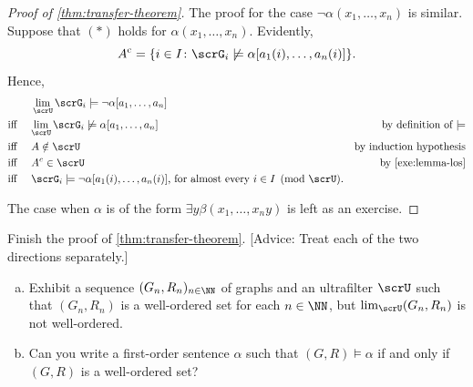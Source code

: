 \begin{proof}[Proof of \cref{thm:transfer-theorem}]
  The proof for the case $\neg\alpha(x_1,\dots, x_n)$ is similar.
  Suppose that $(*)$ holds for $\alpha(x_1,\dots, x_n)$.
  Evidently,
  \[
    A^\text{c}=\{i\in I \colon \scrG_i\not\models\alpha[a_1(i),\dots, a_n(i)] \}.
  \]
  Hence,
  \begin{align*}
                   & \lim_{\scrU} \scrG_i \models \neg\alpha [a_1,\dots, a_n]                                            &                                   \\
  \text{iff \quad} & \text{$\lim_{\scrU} \scrG_i \not \models \alpha [a_1,\dots, a_n]$}                                  & \text{by definition of $\models$} \\
  \text{iff \quad} & \text{$A \notin\scrU$}                                                                              & \text{by induction hypothesis}    \\
  \text{iff \quad} & \text{$A^c \in\scrU$}                                                                               & \text{by \cref{exe:lemma-los}}    \\
  \text{iff \quad} & \text{$\scrG_i \models \neg\alpha[a_1(i),\dots, a_n(i)] $, for almost every $i\in I \pmod{\scrU}$.} &                                   \\
  \end{align*}

  The case when $\alpha$ is of the form $\exists y \beta(x_1,\dots, x_n y)$ is left as an exercise.
\end{proof}

\begin{exercise}
  Finish the proof of \cref{thm:transfer-theorem}.
  [Advice:
  Treat each of the two directions separately.]
\end{exercise}

\begin{exercise}
  \begin{enumerate}[(a)]
  \item
    Exhibit a sequence $(G_n,R_n)_{n\in\NN}$ of graphs and an ultrafilter $\scrU$ such that $(G_n,R_n)$ is a well-ordered set for each $n\in \NN$, but $\lim_{\scrU}(G_n,R_n)$ is not well-ordered.
  \item
    Can you write a first-order sentence $\alpha$ such that $(G,R)\models \alpha$ if and only if $(G,R)$ is a well-ordered set?
  \end{enumerate}
\end{exercise}

